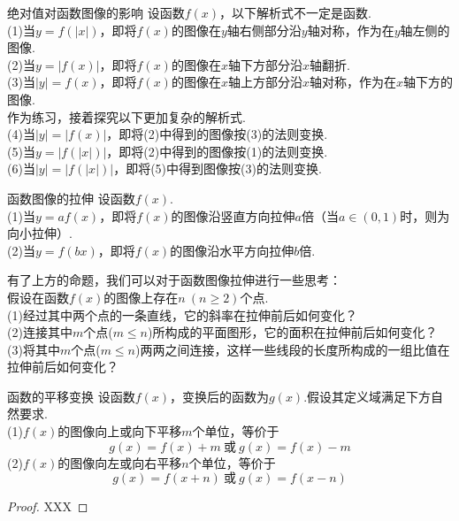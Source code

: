 \documentclass[lang=cn, zihao=4.5]{elegantbook}
\begin{document}
\begin{proposition}{绝对值对函数图像的影响}
    设函数$f(x)$，以下解析式不一定是函数.\\
    (1)当$y=f(|x|)$，即将$f(x)$的图像在$y$轴右侧部分沿$y$轴对称，作为在$y$轴左侧的图像.\\
    (2)当$y=|f(x)|$，即将$f(x)$的图像在$x$轴下方部分沿$x$轴翻折.\\
    (3)当$|y|=f(x)$，即将$f(x)$的图像在$x$轴上方部分沿$x$轴对称，作为在$x$轴下方的图像.\\
    作为练习，接着探究以下更加复杂的解析式.\\
    (4)当$|y|=|f(x)|$，即将(2)中得到的图像按(3)的法则变换.\\
    (5)当$y=|f(|x|)|$，即将(2)中得到的图像按(1)的法则变换.\\
    (6)当$|y|=|f(|x|)|$，即将(5)中得到图像按(3)的法则变换.
\end{proposition}

\begin{proposition}{函数图像的拉伸}
    设函数$f(x)$.\\
    (1)当$y=af(x)$，即将$f(x)$的图像沿竖直方向拉伸$a$倍（当$a\in (0,1)$时，则为向小拉伸）.\\
    (2)当$y=f(b x)$，即将$f(x)$的图像沿水平方向拉伸$b$倍.
\end{proposition}

\begin{problem}
    有了上方的命题，我们可以对于函数图像拉伸进行一些思考：\\
    假设在函数$f(x)$的图像上存在$n~(n \geq 2)$个点.\\
    (1)经过其中两个点的一条直线，它的斜率在拉伸前后如何变化？\\
    (2)连接其中$m$个点($m \leq n$)所构成的平面图形，它的面积在拉伸前后如何变化？\\
    (3)将其中$m$个点($m \leq n$)两两之间连接，这样一些线段的长度所构成的一组比值在拉伸前后如何变化？\\
\end{problem}

\begin{proposition}{函数的平移变换}
    设函数$f(x)$，变换后的函数为$g(x)$.假设其定义域满足下方自然要求.\\
    (1)$f(x)$的图像向上或向下平移$m$个单位，等价于$$g(x)=f(x)+m \ \text{或} \ g(x)=f(x)-m$$
    (2)$f(x)$的图像向左或向右平移$n$个单位，等价于$$g(x)=f(x+n) \ \text{或} \ g(x)=f(x-n)$$
\end{proposition}
\begin{proof}
    XXX
\end{proof}
\end{document}
